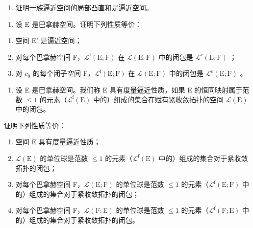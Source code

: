 \begin{enumerate}
\def\labelenumi{\alph{enumi})}
\setcounter{enumi}{1}
\tightlist
\item
  证明一族逼近空间的局部凸直和是逼近空间。
\end{enumerate}

\begin{enumerate}
\def\labelenumi{\arabic{enumi})}
\setcounter{enumi}{33}
\tightlist
\item
  设 E 是巴拿赫空间。证明下列性质等价：
\end{enumerate}

\begin{enumerate}
\def\labelenumi{(\roman{enumi})}
\item
  空间 E' 是逼近空间；
\item
  对每个巴拿赫空间 F，\(\mathcal{L}^{\mathrm{f}}(\mathrm{E};\mathrm{F})\) 在 \(\mathcal{L}(\mathrm{E};\mathrm{F})\) 中的闭包是 \(\mathcal{L}^{\mathrm{c}}(\mathrm{E};\mathrm{F})\) ；
\item
  对 \(c_{0}\) 的每个闭子空间 F，\(\mathcal{L}^{\mathrm{f}}(\mathrm{E};\mathrm{F})\) 在 \(\mathcal{L}(\mathrm{E};\mathrm{F})\) 中的闭包是 \(\mathcal{L}^{\mathrm{c}}(\mathrm{E};\mathrm{F})\) 。
\end{enumerate}

\begin{enumerate}
\def\labelenumi{\arabic{enumi})}
\setcounter{enumi}{34}
\tightlist
\item
  设 E 是巴拿赫空间。我们称 E 具有度量逼近性质，如果 E 的恒同映射属于范数 \(\leqslant 1\) 的元素（\(\mathcal{L}^{\mathrm{f}}(\mathrm{E})\) 中的）组成的集合在赋有紧收敛拓扑的空间 \(\mathcal{L}(\mathrm{E})\) 中的闭包。
\end{enumerate}

证明下列性质等价：

\begin{enumerate}
\def\labelenumi{(\roman{enumi})}
\item
  空间 E 具有度量逼近性质；
\item
  \(\mathcal{L}(\mathrm{E})\) 的单位球是范数 \(\leqslant 1\) 的元素（\(\mathcal{L}^{\mathrm{f}}(\mathrm{E})\) 中的）组成的集合对于紧收敛拓扑的闭包；
\item
  对每个巴拿赫空间 F，\(\mathcal{L}(\mathrm{E};\mathrm{F})\) 的单位球是范数 \(\leqslant 1\) 的元素（\(\mathcal{L}^{\mathrm{f}}(\mathrm{E};\mathrm{F})\) 中的）组成的集合对于紧收敛拓扑的闭包；
\item
  对每个巴拿赫空间 F，\(\mathcal{L}(\mathrm{F};\mathrm{E})\) 的单位球是范数 \(\leqslant 1\) 的元素（\(\mathcal{L}^{\mathrm{f}}(\mathrm{F};\mathrm{E})\) 中的）组成的集合对于紧收敛拓扑的闭包。
\end{enumerate}

